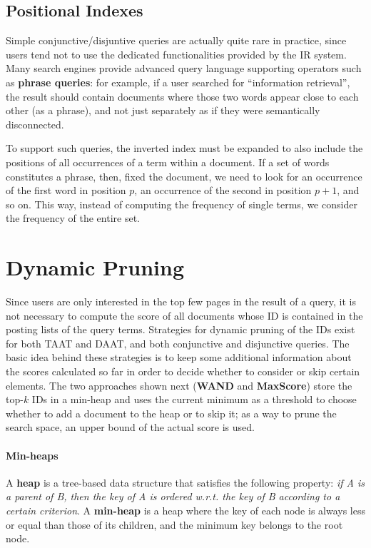 \subsection{Positional Indexes}

Simple conjunctive/disjuntive queries are actually quite rare in practice, since users tend not to use the dedicated functionalities provided by the IR system. Many search engines provide advanced query language supporting operators such as \textbf{phrase queries}: for example, if a user searched for ``information retrieval'', the result should contain documents where those two words appear close to each other (as a phrase), and not just separately as if they were semantically disconnected.

To support such queries, the inverted index must be expanded to also include the positions of all occurrences of a term within a document. If a set of words constitutes a phrase, then, fixed the document, we need to look for an occurrence of the first word in position $p$, an occurrence of the second in position $p+1$, and so on. This way, instead of computing the frequency of single terms, we consider the frequency of the entire set.

\section{Dynamic Pruning}

Since users are only interested in the top few pages in the result of a query, it is not necessary to compute the score of all documents whose ID is contained in the posting lists of the query terms. Strategies for dynamic pruning of the IDs exist for both TAAT and DAAT, and both conjunctive and disjunctive queries. The basic idea behind these strategies is to keep some additional information about the scores calculated so far in order to decide whether to consider or skip certain elements. The two approaches shown next (\textbf{WAND} and \textbf{MaxScore}) store the top-$k$ IDs in a min-heap and uses the current minimum as a threshold to choose whether to add a document to the heap or to skip it; as a way to prune the search space, an upper bound of the actual score is used.

\paragraph{Min-heaps}

A \textbf{heap} is a tree-based data structure that satisfies the following property: \textit{if A is a parent of B, then the key of A is ordered w.r.t. the key of B according to a certain criterion}. A \textbf{min-heap} is a heap where the key of each node is always less or equal than those of its children, and the minimum key belongs to the root node. 

